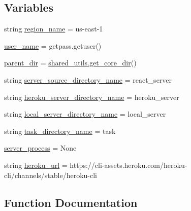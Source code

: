 \subsection*{Variables}
\begin{DoxyCompactItemize}
\item 
string \hyperlink{namespaceparlai_1_1mturk_1_1core_1_1dev_1_1server__utils_aa3164afb803a5562130e172a9a330de7}{region\+\_\+name} = \textquotesingle{}us-\/east-\/1\textquotesingle{}
\item 
\hyperlink{namespaceparlai_1_1mturk_1_1core_1_1dev_1_1server__utils_aa1c891d191a109c1941a85bf62bd4888}{user\+\_\+name} = getpass.\+getuser()
\item 
\hyperlink{namespaceparlai_1_1mturk_1_1core_1_1dev_1_1server__utils_a432ae14c0d872fbfebe4d9b7d73d13b9}{parent\+\_\+dir} = \hyperlink{namespaceparlai_1_1mturk_1_1core_1_1dev_1_1shared__utils_aead9ab64df5040f7a479ea81deea353c}{shared\+\_\+utils.\+get\+\_\+core\+\_\+dir}()
\item 
string \hyperlink{namespaceparlai_1_1mturk_1_1core_1_1dev_1_1server__utils_a6eec702e0f29319aa5e6236c913d9fb5}{server\+\_\+source\+\_\+directory\+\_\+name} = \textquotesingle{}react\+\_\+server\textquotesingle{}
\item 
string \hyperlink{namespaceparlai_1_1mturk_1_1core_1_1dev_1_1server__utils_acd6fa18bae99efed428967735b638458}{heroku\+\_\+server\+\_\+directory\+\_\+name} = \textquotesingle{}heroku\+\_\+server\textquotesingle{}
\item 
string \hyperlink{namespaceparlai_1_1mturk_1_1core_1_1dev_1_1server__utils_a322d13501a90511c823c511339b31b65}{local\+\_\+server\+\_\+directory\+\_\+name} = \textquotesingle{}local\+\_\+server\textquotesingle{}
\item 
string \hyperlink{namespaceparlai_1_1mturk_1_1core_1_1dev_1_1server__utils_a8bd9d324bb162c9bd3ce87292d980b92}{task\+\_\+directory\+\_\+name} = \textquotesingle{}task\textquotesingle{}
\item 
\hyperlink{namespaceparlai_1_1mturk_1_1core_1_1dev_1_1server__utils_a493aaab7f9dc87be1fc68c9f35bf71fd}{server\+\_\+process} = None
\item 
string \hyperlink{namespaceparlai_1_1mturk_1_1core_1_1dev_1_1server__utils_a55012f44eee0cb68f09dc21d4df0b7a6}{heroku\+\_\+url} = \textquotesingle{}https\+://cli-\/assets.\+heroku.\+com/heroku-\/cli/channels/stable/heroku-\/cli\textquotesingle{}
\end{DoxyCompactItemize}


\subsection{Function Documentation}
\mbox{\label{namespaceparlai_1_1mturk_1_1core_1_1dev_1_1server__utils_ab2ee72bd56197de749229032b05254da}} 
